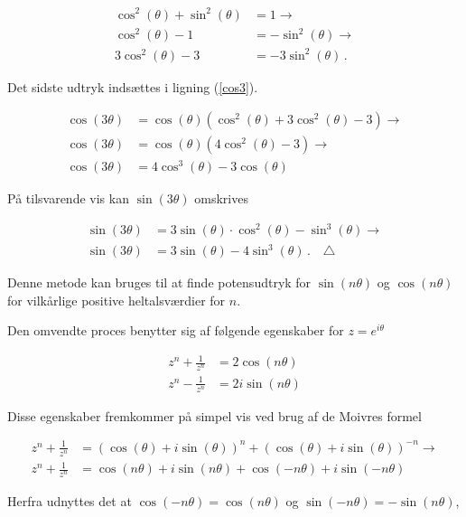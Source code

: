 \documentclass[a4paper, 12pt,titlepage]{article}
\begin{document}
\begin{align*}
    \cos^2(\theta) + \sin^2(\theta) &= 1 \to \\
    \cos^2(\theta) - 1 &= -\sin^2(\theta) \to \\
    3\cos^2(\theta) - 3 &= -3\sin^2(\theta)\,.
\end{align*}

Det sidste udtryk indsættes i ligning (\ref{cos3}).

\begin{align}
    \cos(3 \theta) &= \cos(\theta) \left( \cos^2(\theta) +3 \cos^2(\theta) -3 \right) \to \nonumber \\
    \cos(3 \theta) &= \cos(\theta) \left( 4 \cos^2(\theta) -3 \right) \to \nonumber \\
    \cos(3 \theta) &= 4 \cos^3(\theta) -3\cos(\theta) 
\end{align}

På tilsvarende vis kan \(\sin(3\theta)\) omskrives

\begin{align}
    \sin(3\theta) &= 3 \sin(\theta) \cdot \cos^2(\theta) -\sin^3(\theta) \to \nonumber \\
    \sin(3\theta) &= 3\sin(\theta) - 4\sin^3(\theta) \,. \quad \triangle
\end{align}

Denne metode kan bruges til at finde potensudtryk for \(\sin(n\theta)\) og \(\cos(n\theta)\) for vilkårlige positive heltalsværdier for \(n\).

Den omvendte proces benytter sig af følgende egenskaber for \(z=e^{i\theta}\)

\begin{align}
    z^n + \frac{1}{z^n} &= 2 \cos (n \theta) \label{cosn}\\
    z^n - \frac{1}{z^n} &= 2i \sin (n \theta)\label{sinn} 
\end{align}

Disse egenskaber fremkommer på simpel vis ved brug af de Moivres formel

\begin{align*}
    z^n + \frac{1}{z^n} &=(\cos(\theta)+i \sin(\theta))^n+(\cos(\theta)+i \sin(\theta))^{-n} \to \\
    z^n + \frac{1}{z^n} &=\cos(n\theta)+i \sin(n\theta)+\cos(-n\theta)+i \sin(-n\theta) 
\end{align*}

Herfra udnyttes det at \(\cos(-n\theta) = \cos(n\theta)\) og \(\sin(-n\theta)=-\sin(n\theta)\),
\end{document}

